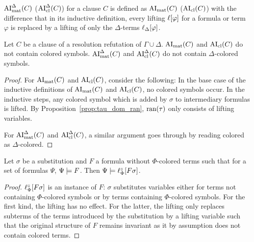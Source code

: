 \documentclass[,%
	draft=false,%
	numbers=noendperiod
	oneside,openany
	a4paper,
	11pt,
]{memoir}
\begin{document}
\begin{defi}
	$\operatorname{AI}_\mathrm{mat}^\Delta(C)$ ($\operatorname{AI}_\mathrm{cl}^\Delta(C)$) for a clause $C$ is defined as $\operatorname{AI}_\mathrm{mat}(C)$ ($\operatorname{AI}_\mathrm{cl}(C)$) with the difference that in its inductive definition, every lifting $\ell[\varphi]$ for a formula or term $\varphi$ is replaced by a lifting of only the $\Delta$-terms $\ell_{\Delta}[\varphi]$.
\end{defi}

\begin{lemma}
	\label{lemma:no_colored_terms}
	Let $C$ be a clause of a resolution refutation of $\Gamma\cup\Delta$.
	$\operatorname{AI}_\mathrm{mat}(C)$ and $\operatorname{AI}_\mathrm{cl}(C)$ do not contain colored symbols. 
	$\operatorname{AI}_\mathrm{mat}^\Delta(C)$ and $\operatorname{AI}_\mathrm{cl}^\Delta(C)$ do not contain \mbox{$\Delta$-c}olored symbols. 
\end{lemma}
\begin{proof}
	For $\operatorname{AI}_\mathrm{mat}(C)$ and $\operatorname{AI}_\mathrm{cl}(C)$, consider the following:
	In the base case of the inductive definitions of $\operatorname{AI}_\mathrm{mat}(C)$ and $\operatorname{AI}_\mathrm{cl}(C)$, no colored symbols occur.
	In the inductive steps, any colored symbol which is added by $\sigma$ to intermediary formulas is lifted.
	By Proposition~\ref{prop:tau_dom_ran}, $\operatorname{ran}(\tau)$ only consists of lifting variables.

	For $\operatorname{AI}_\mathrm{mat}^\Delta(C)$ and $\operatorname{AI}_\mathrm{cl}^\Delta(C)$, a similar argument goes through by reading colored as $\Delta$-colored. 
\end{proof}

\begin{lemma}
	\label{lemma:substitute_and_lift}
	Let $\sigma$ be a substitution and $F$ a formula without $\Phi$-colored terms such that for a set of formulas $\Psi$, $\Psi \models F$.
	Then $\Psi \models \ell_{\Phi}^{z}[F\sigma]$.
\end{lemma}
\begin{proof}
	$\ell_{\Phi}^{z}[F\sigma]$ is an instance of $F$: 
	$\sigma$ substitutes variables either for terms not containing $\Phi$-colored symbols or by terms containing $\Phi$-colored symbols.
	For the first kind, the lifting has no effect.
	For the latter, the lifting only replaces subterms of the terms introduced by the substitution by a lifting variable such that the original structure of $F$ remains invariant as it by assumption does not contain colored terms.
\end{proof}
\end{document}
